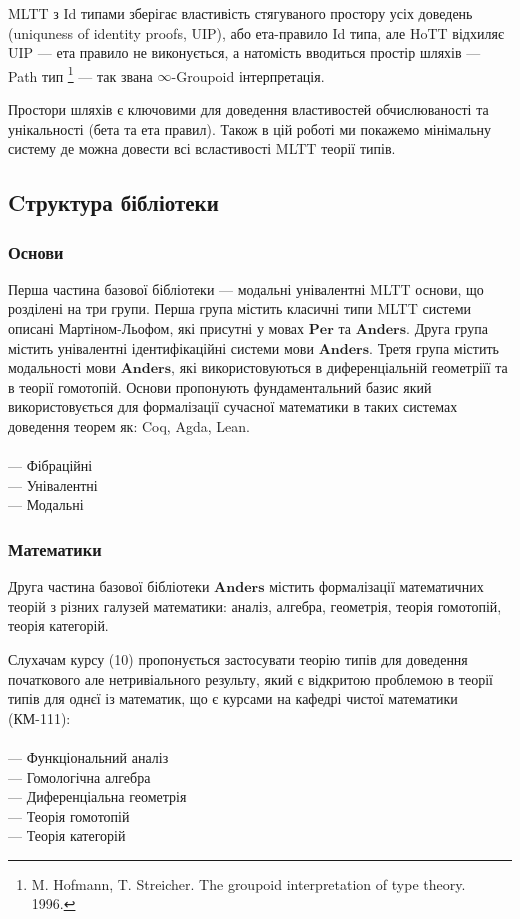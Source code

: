 MLTT з Id типами зберігає властивість стягуваного простору усіх
доведень (uniquness of identity proofs, UIP), або ета-правило Id типа,
але HoTT відхиляє UIP --- ета правило не виконується, а натомість
вводиться простір шляхів --- Path тип \footnote{M. Hofmann, T. Streicher.
The groupoid interpretation of type theory. 1996.} --- так
звана $\infty$-Groupoid інтерпретація.

Простори шляхів є ключовими для доведення властивостей обчислюваності
та унікальності (бета та ета правил). Також в цій роботі ми покажемо
мінімальну систему де можна довести всі всластивості MLTT теорії типів.

\newpage
\subsection{Cтруктура бібліотеки}

\subsubsection{Основи}
Перша частина базової бібліотеки --- модальні унівалентні MLTT основи,
що розділені на три групи. Перша група містить класичні типи MLTT
системи описані Мартіном-Льофом, які присутні у мовах $\mathbf{Per}$
та $\mathbf{Anders}$. Друга група містить унівалентні ідентифікаційні
системи мови $\mathbf{Anders}$. Третя група містить модальності мови
$\mathbf{Anders}$, які використовуються в диференціальній геометріїї
та в теорії гомотопій. Основи пропонують фундаментальний базис який
використовується для формалізації сучасної математики в таких системах
доведення теорем як: Coq, Agda, Lean.
\\
\\
\noindent
--- Фібраційні \\
--- Унівалентні \\
--- Модальні

\subsubsection{Математики}

Друга частина базової бібліотеки $\mathbf{Anders}$ містить формалізації математичних
теорій з різних галузей математики: аналіз, алгебра, геометрія,
теорія гомотопій, теорія категорій.

Слухачам курсу (10) пропонується застосувати теорію типів для
доведення початкового але нетривіального результу, який є
відкритою проблемою в теорії типів для однєї із математик,
що є курсами на кафедрі чистої математики (КМ-111):\\
\\
\noindent
--- Функціональний аналіз \\
--- Гомологічна алгебра \\
--- Диференціальна геометрія \\
--- Теорія гомотопій \\
--- Теорія категорій \\

